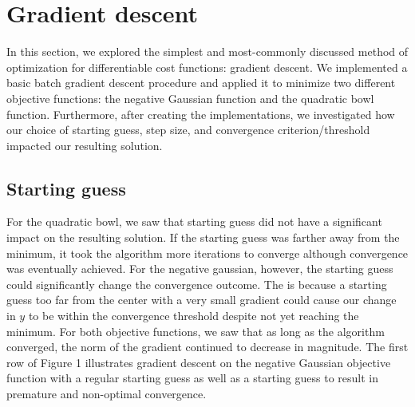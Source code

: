 \documentclass{article}
\begin{document}

\section{Gradient descent}
In this section, we explored the simplest and most-commonly discussed method of optimization for differentiable cost functions: gradient descent. We implemented a basic batch gradient descent procedure and applied it to minimize two different objective functions: the negative Gaussian function and the quadratic bowl function. Furthermore, after creating the implementations, we investigated how our choice of starting guess, step size, and convergence criterion/threshold impacted our resulting solution.

\subsection{Starting guess}
For the quadratic bowl, we saw that starting guess did not have a significant impact on the resulting solution. If the starting guess was farther away from the minimum, it took the algorithm more iterations to converge although convergence was eventually achieved. For the negative gaussian, however, the starting guess could significantly change the convergence outcome. The is because a starting guess too far from the center with a very small gradient could cause our change in $y$ to be within the convergence threshold despite not yet reaching the minimum. For both objective functions, we saw that as long as the algorithm converged, the norm of the gradient continued to decrease in magnitude. The first row of Figure 1 illustrates gradient descent on the negative Gaussian objective function with a regular starting guess as well as a starting guess to result in premature and non-optimal convergence.
\end{document}
